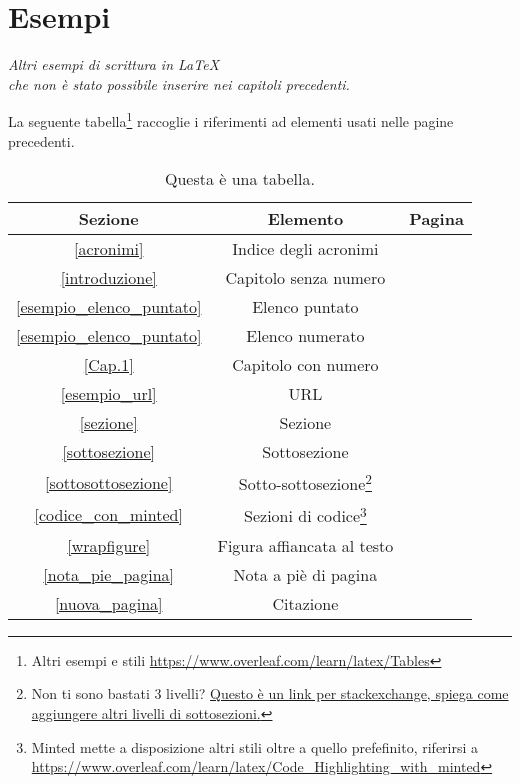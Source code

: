 \documentclass[envcountsame,envcountchap]{svmono}
\begin{document}
\chapter{Esempi}  \label{Cap.3}

\vspace{2cm}

\begin{flushright}
 \textit{Altri esempi di scrittura in \LaTeX\\ che non è stato possibile inserire nei capitoli precedenti.}
\end{flushright}

\vspace{0.5cm}

La seguente tabella\footnote{Altri esempi e stili \url{https://www.overleaf.com/learn/latex/Tables}} raccoglie i riferimenti ad elementi usati nelle pagine precedenti.

\begin{table}[h!]
    \centering
    \begin{tabular}{||c | c | c||} 
        \hline
        Sezione & Elemento & Pagina \\ [0.5ex] 
        \hline\hline
        \ref{acronimi} & Indice degli acronimi & \pageref{acronimi} \\ 
        \ref{introduzione} & Capitolo senza numero & \pageref{introduzione} \\
        \ref{esempio_elenco_puntato} & Elenco puntato & \pageref{esempio_elenco_puntato} \\
        \ref{esempio_elenco_puntato} & Elenco numerato & \pageref{esempio_elenco_puntato} \\
        \ref{Cap.1} & Capitolo con numero & \pageref{Cap.1} \\
        \ref{esempio_url} & URL & \pageref{esempio_url} \\
        \ref{sezione} & Sezione & \pageref{sezione} \\
        \ref{sottosezione} & Sottosezione & \pageref{sottosezione} \\
        \ref{sottosottosezione} & Sotto-sottosezione\footnote{Non ti sono bastati 3 livelli? \href{https://tex.stackexchange.com/questions/60209/how-to-add-an-extra-level-of-sections-with-headings-below-subsubsection}{Questo è un link per stackexchange, spiega come aggiungere altri livelli di sottosezioni.}} & \pageref{sottosottosezione} \\
        \ref{codice_con_minted} & Sezioni di codice\footnote{Minted mette a disposizione altri stili oltre a quello prefefinito, riferirsi a \url{https://www.overleaf.com/learn/latex/Code_Highlighting_with_minted}} & \pageref{codice_con_minted} \\
        \ref{wrapfigure} & Figura affiancata al testo & \pageref{wrapfigure} \\
        \ref{nota_pie_pagina} & Nota a piè di pagina & \pageref{nota_pie_pagina} \\
        \ref{nuova_pagina} & Citazione & \pageref{nuova_pagina} \\ [1ex] 
        \hline
    \end{tabular}
    \caption{Questa è una tabella.}
    \label{tabella_esempi}
\end{table}
\end{document}

